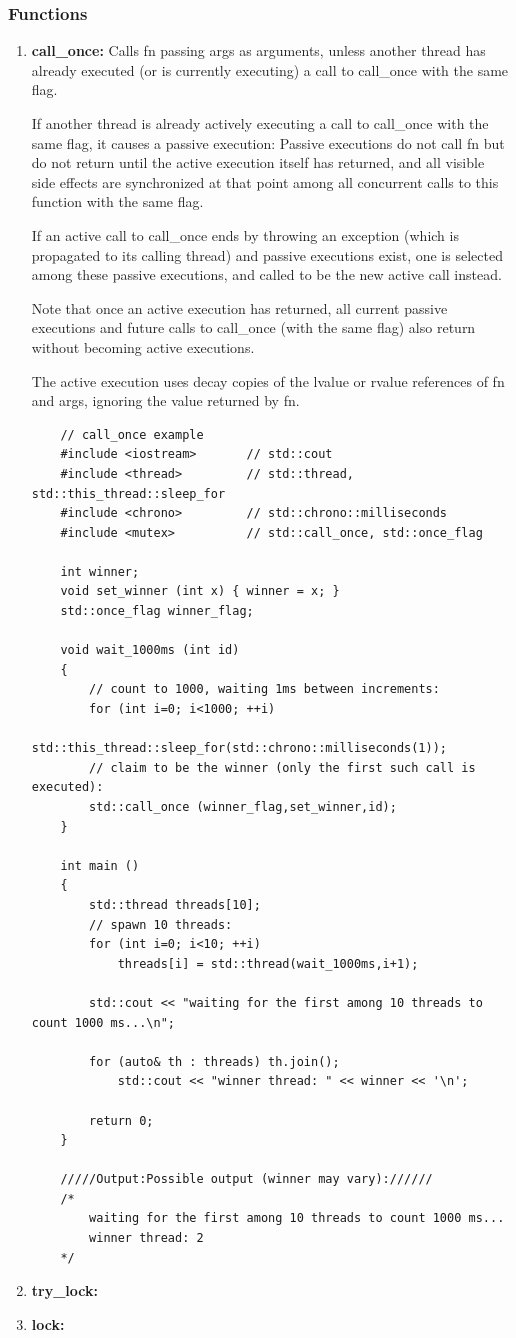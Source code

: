 \documentclass[UTF8,a4paper,12pt]{ctexbook}
\begin{document}
		\subsubsection{Functions}
			\begin{enumerate}[itemindent = 1em]
				\item \textbf{call\_once:}
					Calls fn passing args as arguments, unless another thread has already executed (or is currently executing) a call to call\_once with the same flag.
					
					If another thread is already actively executing a call to call\_once with the same flag, it causes a passive execution: Passive executions do not call fn but do not return until the active execution itself has returned, and all visible side effects are synchronized at that point among all concurrent calls to this function with the same flag.
					
					If an active call to call\_once ends by throwing an exception (which is propagated to its calling thread) and passive executions exist, one is selected among these passive executions, and called to be the new active call instead.
					
					Note that once an active execution has returned, all current passive executions and future calls to call\_once (with the same flag) also return without becoming active executions.
					
					The active execution uses decay copies of the lvalue or rvalue references of fn and args, ignoring the value returned by fn.
\begin{lstlisting}
	// call_once example
	#include <iostream>       // std::cout
	#include <thread>         // std::thread, std::this_thread::sleep_for
	#include <chrono>         // std::chrono::milliseconds
	#include <mutex>          // std::call_once, std::once_flag
	
	int winner;
	void set_winner (int x) { winner = x; }
	std::once_flag winner_flag;
	
	void wait_1000ms (int id) 
	{
		// count to 1000, waiting 1ms between increments:
		for (int i=0; i<1000; ++i)
			std::this_thread::sleep_for(std::chrono::milliseconds(1));
		// claim to be the winner (only the first such call is executed):
		std::call_once (winner_flag,set_winner,id);
	}
	
	int main ()
	{
		std::thread threads[10];
		// spawn 10 threads:
		for (int i=0; i<10; ++i)
			threads[i] = std::thread(wait_1000ms,i+1);
		
		std::cout << "waiting for the first among 10 threads to count 1000 ms...\n";
		
		for (auto& th : threads) th.join();
			std::cout << "winner thread: " << winner << '\n';
		
		return 0;
	}
	
	/////Output:Possible output (winner may vary)://////
	/*
		waiting for the first among 10 threads to count 1000 ms...
		winner thread: 2	
	*/
\end{lstlisting}
				\item \textbf{try\_lock:}
				\item \textbf{lock:}
			\end{enumerate}
\end{document}

